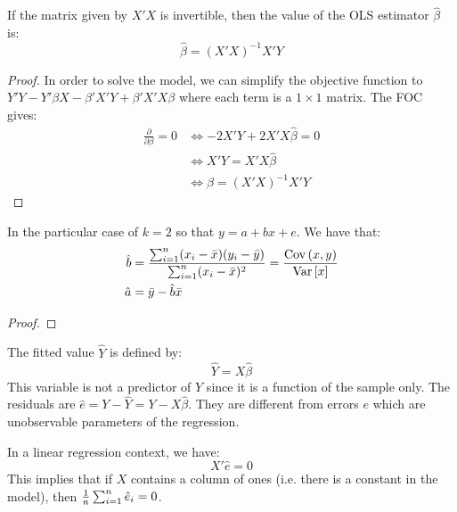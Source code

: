 \begin{proposition}
If the matrix given by $X'X$ is invertible, then the value of the OLS estimator $\hat\beta$ is:$$\hat\beta=(X'X)^{-1}X'Y$$
\end{proposition}
\begin{proof}
In order to solve the model, we can simplify the objective function to $Y'Y - Y'\beta X - \beta'X'Y + \beta'X'X\beta $ where each term is a $1\times 1$ matrix. The FOC gives:\begin{align*}
\frac{\partial }{\partial \beta} = 0 & \Leftrightarrow -2X'Y + 2X'X\hat\beta = 0 \\ & \Leftrightarrow X'Y=X'X\hat\beta \\ & \Leftrightarrow \hat\beta=(X'X)^{-1}X'Y
\end{align*}
\end{proof}

\begin{proposition}
In the particular case of $k=2$ so that $y = a + bx +e$. We have that: \begin{align*}
\hat b & = \frac{\sum_{i=1}^{n}(x_i - \bar x)(y_i - \bar y)}{\sum_{i=1}^{n}(x_i - \bar x)^2}  = \frac{\operatorname{Cov}\left(x,y\right)}{\operatorname{Var}\left[x\right]}\\
\hat a & = \bar y - \hat b \bar x
\end{align*}
\end{proposition}

\begin{proof}

\end{proof}

\begin{definition}
The fitted value $\hat{Y}$ is defined by:$$\hat{Y} = X\hat{\beta}$$ This variable is not a predictor of $Y$ since it is a function of the sample only. The residuals are $\hat{e} = Y - \hat{Y} = Y - X\hat{\beta}$. They are different from errors $e$ which are unobservable parameters of the regression.
\end{definition}

\begin{proposition}
In a linear regression context, we have: $$X'\hat e = 0$$ This implies that if $X$ contains a column of ones (i.e. there is a constant in the model), then $\frac{1}{n} \sum_{i=1}^{n}\hat e_i = 0$.
\end{proposition}

